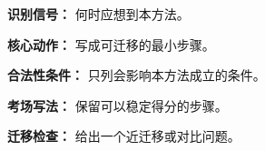 
\begin{knowledgeBox}
\textbf{识别信号：} 何时应想到本方法。

\textbf{核心动作：} 写成可迁移的最小步骤。

\textbf{合法性条件：} 只列会影响本方法成立的条件。

\textbf{考场写法：} 保留可以稳定得分的步骤。

\textbf{迁移检查：} 给出一个近迁移或对比问题。
\end{knowledgeBox}
